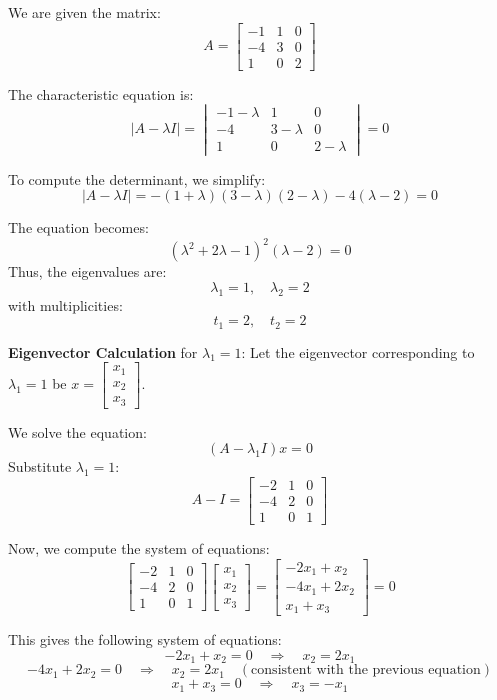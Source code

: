 \documentclass{article}
\begin{document}
We are given the matrix:
\[
A = \begin{bmatrix} -1 & 1 & 0 \\ -4 & 3 & 0 \\ 1 & 0 & 2 \end{bmatrix}
\]

The characteristic equation is:
\[
|A - \lambda I| = \begin{vmatrix} -1 - \lambda & 1 & 0 \\ -4 & 3 - \lambda & 0 \\ 1 & 0 & 2 - \lambda \end{vmatrix} = 0
\]

To compute the determinant, we simplify:
\[
|A - \lambda I| = -(1 + \lambda)(3 - \lambda)(2 - \lambda) - 4(\lambda - 2) = 0
\]

The equation becomes:
\[
(\lambda^2 + 2\lambda - 1)^2 (\lambda - 2) = 0
\]
Thus, the eigenvalues are:
\[
\lambda_1 = 1, \quad \lambda_2 = 2
\]
with multiplicities:
\[
t_1 = 2, \quad t_2 = 2
\]

\textbf{Eigenvector Calculation} for \( \lambda_1 = 1 \):
Let the eigenvector corresponding to \( \lambda_1 = 1 \) be \( x = \begin{bmatrix} x_1 \\ x_2 \\ x_3 \end{bmatrix} \).

We solve the equation:
\[
(A - \lambda_1 I) x = 0
\]
Substitute \( \lambda_1 = 1 \):
\[
A - I = \begin{bmatrix} -2 & 1 & 0 \\ -4 & 2 & 0 \\ 1 & 0 & 1 \end{bmatrix}
\]

Now, we compute the system of equations:
\[
\begin{bmatrix} -2 & 1 & 0 \\ -4 & 2 & 0 \\ 1 & 0 & 1 \end{bmatrix} \begin{bmatrix} x_1 \\ x_2 \\ x_3 \end{bmatrix} = \begin{bmatrix} -2x_1 + x_2 \\ -4x_1 + 2x_2 \\ x_1 + x_3 \end{bmatrix} = 0
\]

This gives the following system of equations:
\[
-2x_1 + x_2 = 0 \quad \Rightarrow \quad x_2 = 2x_1
\]
\[
-4x_1 + 2x_2 = 0 \quad \Rightarrow \quad x_2 = 2x_1 \quad (\text{consistent with the previous equation})
\]
\[
x_1 + x_3 = 0 \quad \Rightarrow \quad x_3 = -x_1
\]
\end{document}
